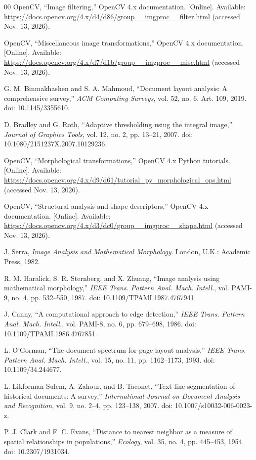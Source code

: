 \begin{thebibliography}{00}
OpenCV, ``Image filtering,'' OpenCV 4.x documentation. [Online]. Available: \url{https://docs.opencv.org/4.x/d4/d86/group__imgproc__filter.html} (accessed Nov. 13, 2026).

OpenCV, ``Miscellaneous image transformations,'' OpenCV 4.x documentation. [Online]. Available: \url{https://docs.opencv.org/4.x/d7/d1b/group__imgproc__misc.html} (accessed Nov. 13, 2026).

G. M. Binmakhashen and S. A. Mahmoud, ``Document layout analysis: A comprehensive survey,'' \emph{ACM Computing Surveys}, vol. 52, no. 6, Art. 109, 2019. doi: 10.1145/3355610.

D. Bradley and G. Roth, ``Adaptive thresholding using the integral image,'' \emph{Journal of Graphics Tools}, vol. 12, no. 2, pp. 13--21, 2007. doi: 10.1080/2151237X.2007.10129236.

OpenCV, ``Morphological transformations,'' OpenCV 4.x Python tutorials. [Online]. Available: \url{https://docs.opencv.org/4.x/d9/d61/tutorial_py_morphological_ops.html} (accessed Nov. 13, 2026).

OpenCV, ``Structural analysis and shape descriptors,'' OpenCV 4.x documentation. [Online]. Available: \url{https://docs.opencv.org/4.x/d3/dc0/group__imgproc__shape.html} (accessed Nov. 13, 2026).

J. Serra, \emph{Image Analysis and Mathematical Morphology}. London, U.K.: Academic Press, 1982.

R. M. Haralick, S. R. Sternberg, and X. Zhuang, ``Image analysis using mathematical morphology,'' \emph{IEEE Trans. Pattern Anal. Mach. Intell.}, vol. PAMI-9, no. 4, pp. 532--550, 1987. doi: 10.1109/TPAMI.1987.4767941.

J. Canny, ``A computational approach to edge detection,'' \emph{IEEE Trans. Pattern Anal. Mach. Intell.}, vol. PAMI-8, no. 6, pp. 679--698, 1986. doi: 10.1109/TPAMI.1986.4767851.

L. O'Gorman, ``The document spectrum for page layout analysis,'' \emph{IEEE Trans. Pattern Anal. Mach. Intell.}, vol. 15, no. 11, pp. 1162--1173, 1993. doi: 10.1109/34.244677.

L. Likforman-Sulem, A. Zahour, and B. Taconet, ``Text line segmentation of historical documents: A survey,'' \emph{International Journal on Document Analysis and Recognition}, vol. 9, no. 2--4, pp. 123--138, 2007. doi: 10.1007/s10032-006-0023-z.

P. J. Clark and F. C. Evans, ``Distance to nearest neighbor as a measure of spatial relationships in populations,'' \emph{Ecology}, vol. 35, no. 4, pp. 445--453, 1954. doi: 10.2307/1931034.

\end{thebibliography}
